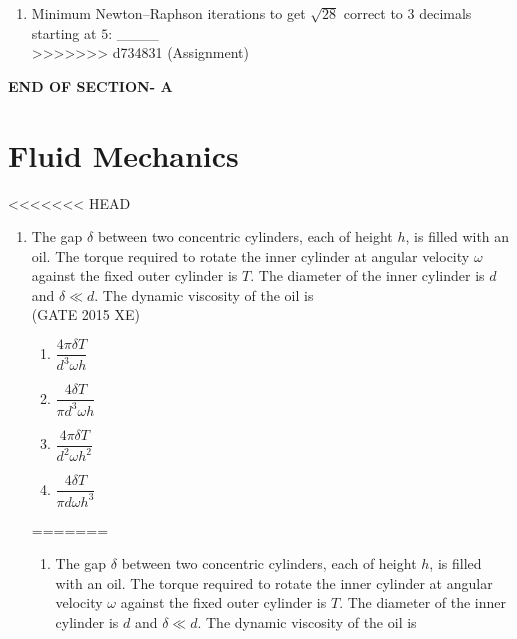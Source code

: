 \documentclass[journal,12pt,onecolumn]{IEEEtran}
\begin{document}
\begin{enumerate}
\begin{enumerate}[label=\arabic*)]
\vspace{0.5cm}

\item Minimum Newton–Raphson iterations to get $\sqrt{28}$ correct to $3$ decimals starting at $5$: \_\_\_\_
\hfill{} \\
>>>>>>> d734831 (Assignment)

\end{enumerate}

\vspace{3\baselineskip}
\begin{center}
    \item[\textbf{END OF SECTION- A}]
\end{center}


\newpage

\section*{Fluid Mechanics}
<<<<<<< HEAD
\bigskip
\begin{enumerate}

\item The gap $\delta$ between two concentric cylinders, each of height $h$, is filled with an oil. The torque required to rotate the inner cylinder at angular velocity $\omega$ against the fixed outer cylinder is $T$. The diameter of the inner cylinder is $d$ and $\delta \ll d$. The dynamic viscosity of the oil is \\
\hfill{(GATE 2015 XE)}

\begin{multicols}{4}
\begin{enumerate}
\item $\dfrac{4\pi \delta T}{d^3 \omega h}$
\item $\dfrac{4\delta T}{\pi d^3 \omega h}$
\item $\dfrac{4\pi \delta T}{d^2 \omega h^2}$
\item $\dfrac{4\delta T}{\pi d \omega h^3}$
\end{enumerate}
\end{multicols}
=======
\vspace{1cm}
\begin{enumerate}[label=\arabic*)]

\item The gap $\delta$ between two concentric cylinders, each of height $h$, is filled with an oil. The torque required to rotate the inner cylinder at angular velocity $\omega$ against the fixed outer cylinder is $T$. The diameter of the inner cylinder is $d$ and $\delta \ll d$. The dynamic viscosity of the oil is  
\hfill{} \\


\end{enumerate}
\end{enumerate}
\end{enumerate}
\end{document}
